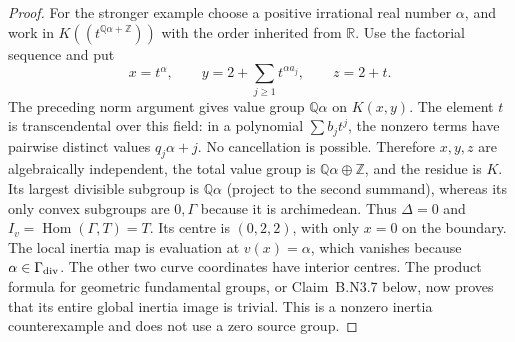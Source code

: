 \begin{proof}
For the stronger example choose a positive irrational real number
$\alpha$, and work in $K((t^{\mathbb Q\alpha+\mathbb Z}))$ with
the order inherited from $\mathbb R$.  Use the factorial sequence and
put
\[
 x=t^\alpha,\qquad
 y=2+\sum_{j\ge1}t^{\alpha a_j},\qquad z=2+t.
\]
The preceding norm argument gives value group $\mathbb Q\alpha$
on $K(x,y)$.  The element $t$ is transcendental over this field:
in a polynomial $\sum b_jt^j$, the nonzero terms have pairwise
distinct values $q_j\alpha+j$.  No cancellation is possible.
Therefore $x,y,z$ are algebraically independent, the total value
group is $\mathbb Q\alpha\oplus\mathbb Z$, and the residue is $K$.
Its largest divisible subgroup is $\mathbb Q\alpha$ (project to the
second summand), whereas its only convex subgroups are $0,\Gamma$
because it is archimedean.  Thus $\Delta=0$ and
$I_v=\operatorname{Hom}(\Gamma,T)=T$.
Its centre is $(0,2,2)$, with only $x=0$ on the boundary.  The local
inertia map is evaluation at $v(x)=\alpha$, which vanishes because
$\alpha\in\Gamma_{\rm div}$.  The other two curve coordinates have
interior centres.  The product formula for geometric fundamental
groups, or Claim~B.N3.7 below, now proves that its entire global
inertia image is trivial.  This is a nonzero inertia counterexample
and does not use a zero source group.
\end{proof}

